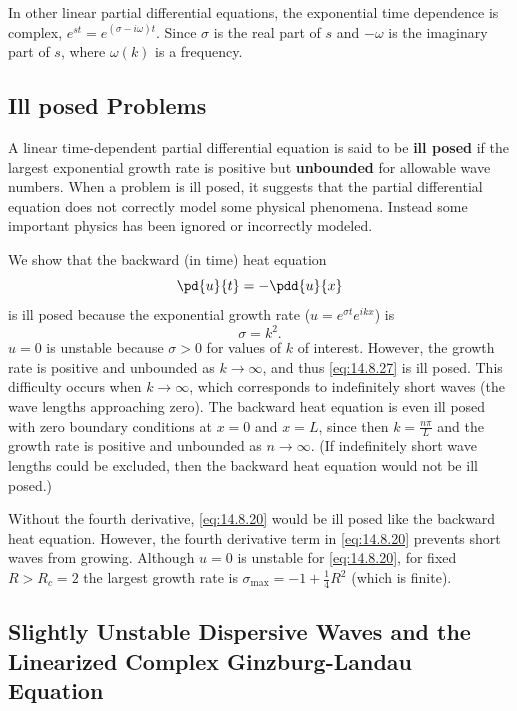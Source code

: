 In other linear partial differential equations, the exponential time dependence is complex, $e^{st} = e^{(\sigma - i\omega)t}$. Since $\sigma$ is the real part of $s$ and $-\omega$ is the imaginary part of $s$, where $\omega(k)$ is a frequency.

\subsection{Ill posed Problems}
\label{subsec:14.8.4}

A linear time-dependent partial differential equation is said to be \textbf{ill posed} if the largest exponential growth rate is positive but \textbf{unbounded} for allowable wave numbers. When a problem is ill posed, it suggests that the partial differential equation does not correctly model some physical phenomena. Instead some important physics has been ignored or incorrectly modeled.

We show that the backward (in time) heat equation
\begin{equation}
\pd{u}{t} = -\pdd{u}{x}
\label{eq:14.8.27}
\end{equation}
is ill posed because the exponential growth rate ($u = e^{\sigma t}e^{ikx}$) is
\[
\sigma = k^2.
\]
$u = 0$ is unstable because $\sigma > 0$ for values of $k$ of interest. However, the growth rate is positive and unbounded as $k \to \infty$, and thus \eqref{eq:14.8.27} is ill posed. This difficulty occurs when $k \to \infty$, which corresponds to indefinitely short waves (the wave lengths approaching zero). The backward heat equation is even ill posed with zero boundary conditions at $x = 0$ and $x = L$, since then $k = \frac{n\pi}{L}$ and the growth rate is positive and unbounded as $n \to \infty$. (If indefinitely short wave lengths could be excluded, then the backward heat equation would not be ill posed.)

Without the fourth derivative, \eqref{eq:14.8.20} would be ill posed like the backward heat equation. However, the fourth derivative term in \eqref{eq:14.8.20} prevents short waves from growing. Although $u = 0$ is unstable for \eqref{eq:14.8.20}, for fixed $R > R_c = 2$ the largest growth rate is $\sigma_{\max} = -1 + \frac{1}{4}R^2$ (which is finite).

\subsection{Slightly Unstable Dispersive Waves and the Linearized Complex Ginzburg-Landau Equation}
\label{subsec:14.8.5}


